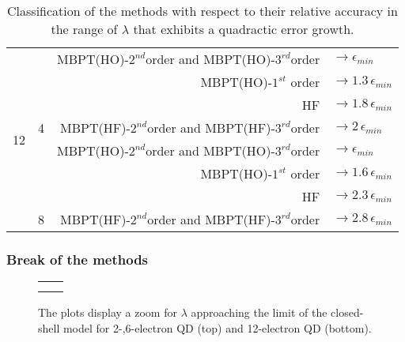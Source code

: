 \documentclass[xcolor=pdftex,hyperref={pdfpagelabels=false},table]{beamer}
\begin{document}
\begin{frame}
\begin{table}
{\begin{tabular}[c]{c|c|r l}
\hline
\multirow{8}{*}{12}& 	& MBPT(HO)-$2^{nd}$order and MBPT(HO)-$3^{rd}$order  & $\rightarrow \epsilon_{min}$ \\ 
		&	&    MBPT(HO)-$1^{st}$ order  & $\rightarrow 1.3\, \epsilon_{min}$ \\ 
		&	&    HF							& $\rightarrow 1.8 \, \epsilon_{min}$ \\ 
	& \multirow{-4}{*}{4}	&   MBPT(HF)-$2^{nd}$order and MBPT(HF)-$3^{rd}$order & $\rightarrow 2 \, \epsilon_{min}$ \\ \cline{2-4}
		&	& MBPT(HO)-$2^{nd}$order and MBPT(HO)-$3^{rd}$order   & $\rightarrow \epsilon_{min}$ \\ 
		&	&  MBPT(HO)-$1^{st}$ order	   & $\rightarrow 1.6 \, \epsilon_{min}$ \\
		&	&    HF							& $\rightarrow 2.3 \, \epsilon_{min}$ \\
	& \multirow{-4}{*}{8}	&    MBPT(HF)-$2^{nd}$order and MBPT(HF)-$3^{rd}$order & $\rightarrow 2.8\, \epsilon_{min}$ \\ 
\toprule[1pt]
\end{tabular}
}
\vspace{-7pt}
 \caption{Classification of the methods with respect to their relative accuracy in the range of $\lambda$ that exhibits a quadractic error growth.}
\end{table} 
\end{frame}

\begin{frame}
\frametitle{Break of the methods}
\begin{figure}
\begin{tabular}{cc}
	\scalebox{0.32}{} & 	\scalebox{0.32}{}  \\
	\scalebox{0.32}{}  & \\
\end{tabular}
	\vspace{-5pt}
	\caption{The plots display a zoom for $\lambda$ approaching the limit of the closed-shell model for 2-,6-electron QD (top) and 12-electron QD (bottom).}
\end{figure}
\end{frame}
\end{document}
